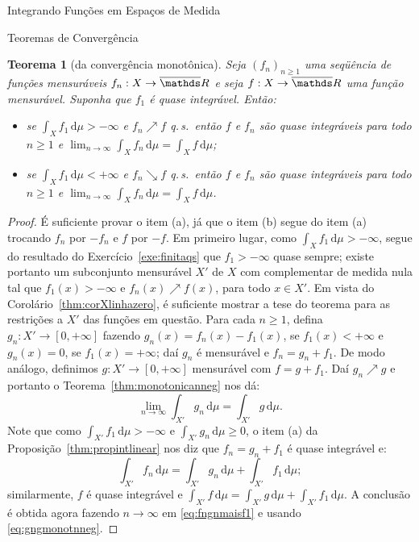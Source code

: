 \documentclass[oneside,final,11pt]{amsbook}
\newcommand{\R}{\mathds R}
\newcommand{\dd}{\mathrm d}
\newcommand{\qs}{\hbox{q.$\,$s.}}
\theoremstyle{remark}\newtheorem{exercise}{Exercício}[chapter]
\theoremstyle{remark}\newtheorem{*exercise}[exercise]{\hbox to 0pt{\hskip 0pt minus 1fil*}Exercício}
\theoremstyle{definition}\newtheorem{exdefin}{Definição}[chapter]
\theoremstyle{plain}\newtheorem{teo}{Teorema}[section]
\theoremstyle{plain}\newtheorem{lem}[teo]{Lema}
\theoremstyle{plain}\newtheorem{prop}[teo]{Proposição}
\theoremstyle{plain}\newtheorem{cor}[teo]{Corolário}
\theoremstyle{definition}\newtheorem{defin}[teo]{Definição}
\theoremstyle{remark}\newtheorem{rem}[teo]{Observação}
\theoremstyle{definition}\newtheorem{notation}[teo]{Notação}
\theoremstyle{definition}\newtheorem{convention}[teo]{Convenção}
\theoremstyle{definition}\newtheorem{example}[teo]{Exemplo}
\numberwithin{section}{chapter}
\numberwithin{equation}{section}
\begin{document}
\begin{chapter}{Integrando Funções em Espaços de Medida}
\begin{section}{Teoremas de Convergência}
\begin{teo}[da convergência monotônica]\label{thm:teomonotonicageral}
%
Seja $(f_n)_{n\ge1}$ uma se\-qüên\-cia de funções mensuráveis $f_n:X\to\overline\R$ e seja $f:X\to\overline\R$ uma função mensurável.
Suponha que $f_1$ é quase integrável. Então:
\begin{itemize}
\item[(a)] se $\int_Xf_1\,\dd\mu>-\infty$ e $f_n\nearrow f$ \qs\ então $f$ e $f_n$ são quase integráveis para todo $n\ge1$
e $\lim_{n\to\infty}\int_Xf_n\,\dd\mu=\int_Xf\,\dd\mu$;
\item[(b)] se $\int_Xf_1\,\dd\mu<+\infty$ e $f_n\searrow f$ \qs\ então $f$ e $f_n$ são quase integráveis para todo $n\ge1$
e $\lim_{n\to\infty}\int_Xf_n\,\dd\mu=\int_Xf\,\dd\mu$.
\end{itemize}
\end{teo}
\begin{proof}
É suficiente provar o item (a), já que o item (b) segue do item (a) trocando $f_n$ por $-f_n$ e $f$ por $-f$.
Em primeiro lugar, como $\int_Xf_1\,\dd\mu>-\infty$, segue do resultado do Exercício~\ref{exe:finitaqs}
que $f_1>-\infty$ quase sempre; existe portanto um subconjunto mensurável $X'$ de $X$ com complementar de medida
nula tal que $f_1(x)>-\infty$ e $f_n(x)\nearrow f(x)$, para todo $x\in X'$. Em vista do Corolário~\ref{thm:corXlinhazero},
é suficiente mostrar a tese do teorema para as restrições a $X'$ das funções em questão. Para cada $n\ge1$, defina
$g_n:X'\to[0,+\infty]$ fazendo $g_n(x)=f_n(x)-f_1(x)$, se $f_1(x)<+\infty$ e $g_n(x)=0$, se $f_1(x)=+\infty$;
daí $g_n$ é mensurável e $f_n=g_n+f_1$. De modo análogo, definimos $g:X'\to[0,+\infty]$ mensurável com
$f=g+f_1$. Daí $g_n\nearrow g$ e portanto o Teorema~\ref{thm:monotonicanneg} nos dá:
\begin{equation}\label{eq:gngmonotnneg}
\lim_{n\to\infty}\int_{X'}g_n\,\dd\mu=\int_{X'}g\,\dd\mu.
\end{equation}
Note que como $\int_{X'}f_1\,\dd\mu>-\infty$ e $\int_{X'}g_n\,\dd\mu\ge0$, o item (a) da Proposição~\ref{thm:propintlinear}
nos diz que $f_n=g_n+f_1$ é quase integrável e:
\begin{equation}\label{eq:fngnmaisf1}
\int_{X'}f_n\,\dd\mu=\int_{X'}g_n\,\dd\mu+\int_{X'}f_1\,\dd\mu;
\end{equation}
similarmente, $f$ é quase integrável e $\int_{X'}f\,\dd\mu=\int_{X'}g\,\dd\mu+\int_{X'}f_1\,\dd\mu$.
A conclusão é obtida agora fazendo $n\to\infty$ em \eqref{eq:fngnmaisf1} e usando \eqref{eq:gngmonotnneg}.
\end{proof}


\end{section}
\end{chapter}
\end{document}
